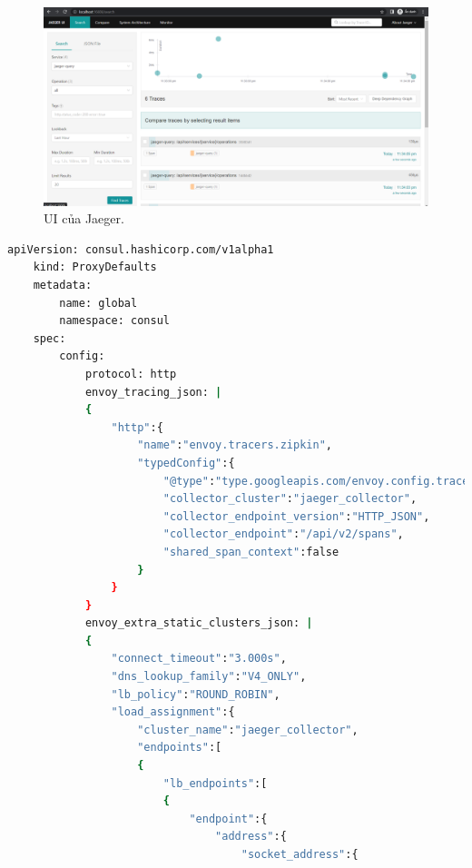 \documentclass[14pt,a4paper]{report}
\begin{document}
{	
	\begin{figure}[h]
		\centering
		\includegraphics[width=1\linewidth]{Pics/jaeger-ui}
		\caption{\label{fig:jaeger-ui} UI của Jaeger.}
		\label{fig:jaeger-ui}
	\end{figure}
	\hspace{0.3cm}{Tiếp theo, chúng ta tiến hành đẩy dữ liệu từ ứng dụng frontend, backend và Proxy lên Jaeger. Để làm được điều này, chúng ta cần can thiệp vào trong code của ứng dụng. Tuy nhiên, ứng dụng frontend và backend đã được cấu hình để có thể đẩy dữ liệu ứng dụng lên trên Jaeger nên chúng ta chỉ việc khai báo thêm biến môi trường cho ứng dụng và ứng dụng sẽ đẩy dữ liệu lên. Còn đối với Proxy, chúng ta cần cấu hình lại một chút như sau:}
	\begin{lstlisting}[language=Bash]
	apiVersion: consul.hashicorp.com/v1alpha1
	kind: ProxyDefaults
	metadata:
		name: global
		namespace: consul
	spec:
		config:
			protocol: http
			envoy_tracing_json: |
			{
				"http":{
					"name":"envoy.tracers.zipkin",
					"typedConfig":{
						"@type":"type.googleapis.com/envoy.config.trace.v3.ZipkinConfig",
						"collector_cluster":"jaeger_collector",
						"collector_endpoint_version":"HTTP_JSON",
						"collector_endpoint":"/api/v2/spans",
						"shared_span_context":false
					}
				}
			}
			envoy_extra_static_clusters_json: |
			{
				"connect_timeout":"3.000s",
				"dns_lookup_family":"V4_ONLY",
				"lb_policy":"ROUND_ROBIN",
				"load_assignment":{
					"cluster_name":"jaeger_collector",
					"endpoints":[
					{
						"lb_endpoints":[
						{
							"endpoint":{
								"address":{
									"socket_address":{

\end{lstlisting}}
\end{document}
